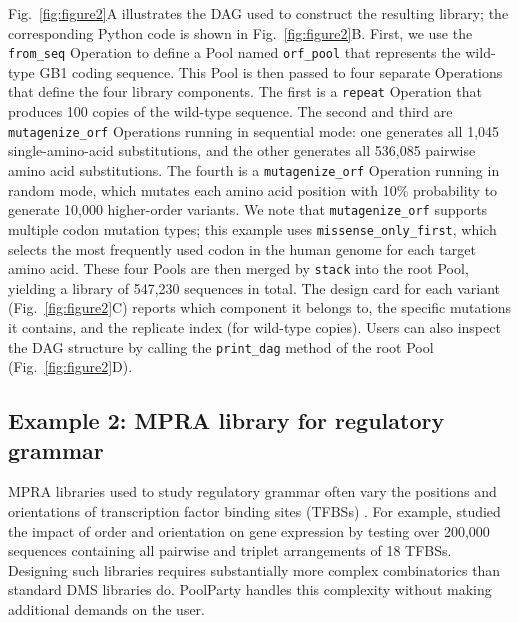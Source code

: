 \documentclass[pdflatex,sn-vancouver-num,referee,oneside]{sn-jnl}
\begin{document}
Fig.~\ref{fig:figure2}A illustrates the DAG used to construct the resulting library; the corresponding Python code is shown in Fig.~\ref{fig:figure2}B. First, we use the \texttt{from\_seq} Operation to define a Pool named \texttt{orf\_pool} that represents the wild-type GB1 coding sequence. This Pool is then passed to four separate Operations that define the four library components. The first is a \texttt{repeat} Operation that produces 100 copies of the wild-type sequence. The second and third are \texttt{mutagenize\_orf} Operations running in sequential mode: one generates all 1,045 single-amino-acid substitutions, and the other generates all 536,085 pairwise amino acid substitutions. The fourth is a \texttt{mutagenize\_orf} Operation running in random mode, which mutates each amino acid position with 10\% probability to generate 10,000 higher-order variants. We note that \texttt{mutagenize\_orf} supports multiple codon mutation types; this example uses \texttt{missense\_only\_first}, which selects the most frequently used codon in the human genome for each target amino acid. These four Pools are then merged by \texttt{stack} into the root Pool, yielding a library of 547,230 sequences in total. The design card for each variant (Fig.~\ref{fig:figure2}C) reports which component it belongs to, the specific mutations it contains, and the replicate index (for wild-type copies). Users can also inspect the DAG structure by calling the \texttt{print\_dag} method of the root Pool (Fig.~\ref{fig:figure2}D).

\subsection*{Example 2: MPRA library for regulatory grammar}\label{subsec:example2-mpra}

MPRA libraries used to study regulatory grammar often vary the positions and orientations of transcription factor binding sites (TFBSs) \citep{Melnikov2012dw, Sharon2012io, King2020aa, Smith2013kn, Grossman2017aa, WeingartenGabbay2019bl, GeorgakopoulosSoares2023tf}. For example, \citet{GeorgakopoulosSoares2023tf} studied the impact of order and orientation on gene expression by testing over 200,000 sequences containing all pairwise and triplet arrangements of 18 TFBSs. Designing such libraries requires substantially more complex combinatorics than standard DMS libraries do. PoolParty handles this complexity without making additional demands on the user.
\end{document}
